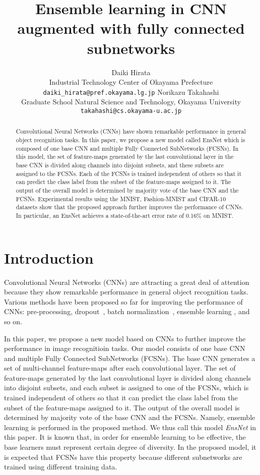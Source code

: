\documentclass[a4j]{article}
\title{Ensemble learning in CNN augmented with fully connected subnetworks}
\author{
  Daiki Hirata\\
  Industrial Technology Center of Okayama Prefecture\\
  \texttt{daiki\_hirata@pref.okayama.lg.jp}
  \And
  Norikazu Takahashi\\
  Graduate School Natural Science and Technology, Okayama University\\
  \texttt{takahashi@cs.okayama-u.ac.jp}
  }
\begin{document}
\maketitle

\begin{abstract}
Convolutional Neural Networks (CNNs) have shown remarkable performance in general object recognition tasks. In this paper, we propose a new model called EnsNet which is composed of one base CNN and multiple Fully Connected SubNetworks (FCSNs). In this model, the set of feature-maps generated by the last convolutional layer in the base CNN is divided along channels into disjoint subsets, and these subsets are assigned to the FCSNs. Each of the FCSNs is trained independent of others so that it can predict the class label from the subset of the feature-maps assigned to it. The output of the overall model is determined by majority vote of the base CNN and the FCSNs. Experimental results using the MNIST, Fashion-MNIST and CIFAR-10 datasets show that the proposed approach further improves the performance of CNNs. In particular, an EnsNet achieves a state-of-the-art error rate of 0.16\% on MNIST. 
\end{abstract}




\section{Introduction}
Convolutional Neural Networks (CNNs) \cite{CNN} are attracting a great deal of attention because they show remarkable performance in general object recognition tasks. Various methods have been proposed so far for improving the performance of CNNs: pre-processing\cite{preprocess1, preprocess2, preprocess3}, dropout~\cite{dropout}, batch normalization~\cite{batchnorm}, ensemble learning \cite{Ensenble1, Ensemble2}, and so on. 

In this paper, we propose a new model based on CNNs to further improve the performance in image recognitioin tasks. Our model consists of one base CNN and multiple Fully Connected SubNetworks (FCSNs). The base CNN generates a set of multi-channel feature-maps after each convolutional layer. The set of feature-maps generated by the last convolutional layer is divided along channels into disjoint subsets, and each subset is assigned to one of the FCSNs, which is trained independent of others so that it can predict the class label from the subset of the feature-maps assigned to it. The output of the overall model is determined by majority vote of the base CNN and the FCSNs. Namely, ensemble learning is performed in the proposed method. We thus call this model {\em EnsNet} in this paper. It is known that, in order for ensemble learning to be effective, the base learners must represent certain degree of diversity. In the proposed model, it is expected that FCSNs have this property because different subnetworks are trained using different training data. 
\end{document}
